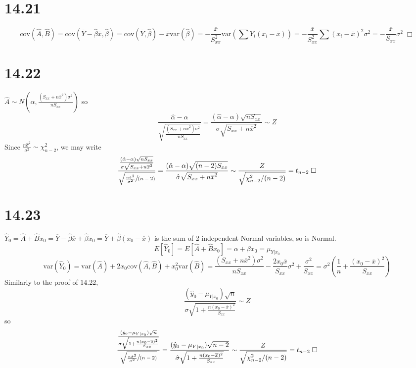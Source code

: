 \documentclass{article}
\begin{document}
\section*{14.21}
$$\mathrm{cov}(\hat{A},\hat{B}) = \mathrm{cov}(\overline{Y}-\hat{\beta}\overline{x}, \hat{\beta}) = \mathrm{cov}(\overline{Y},\hat{\beta}) - \overline{x}\mathrm{var}(\hat{\beta}) = - \frac{\overline{x}}{S_{xx}^2}\mathrm{var}(\sum Y_i(x_i-\overline{x})) = - \frac{\overline{x}}{S_{xx}^2}\sum (x_i-\overline{x})^2\sigma^2 = - \frac{\overline{x}}{S_{xx}}\sigma^2 \; \Box$$

\section*{14.22}
$\hat{A} \sim N(\alpha, \frac{(S_{xx}+n\overline{x}^2)\sigma^2}{nS_{xx}})$ so
$$\frac{\hat{\alpha}- \alpha}{\sqrt{\frac{(S_{xx}+n\overline{x}^2)\sigma^2}{nS_{xx}}}} = \frac{(\hat{\alpha}- \alpha)\sqrt{nS_{xx}}}{\sigma\sqrt{S_{xx}+n\overline{x}^2}} \sim Z$$
Since $\frac{n\hat{\sigma}^2}{\sigma^2} \sim \chi^2_{n-2}$, we may write
$$\frac{\frac{(\hat{\alpha}- \alpha)\sqrt{nS_{xx}}}{\sigma\sqrt{S_{xx}+n\overline{x}^2}}}{\sqrt{\sfrac{\frac{n\hat{\sigma}^2}{\sigma^2}}{(n-2)}}} = \frac{(\hat{\alpha}- \alpha)\sqrt{(n-2)S_{xx}}}{\hat{\sigma}\sqrt{S_{xx}+n\overline{x}^2}} \sim \frac{Z}{\sqrt{\chi^2_{n-2}/(n-2)}} = t_{n-2} \;\Box$$

\section*{14.23}
$\hat{Y}_0 = \hat{A} + \hat{B}x_0 = \overline{Y} - \hat{\beta}\overline{x} + \hat{\beta}x_0 = \overline{Y} + \hat{\beta}(x_0-\overline{x})$ is the sum of 2 independent Normal variables, so is Normal.
$$E[\hat{Y}_0] = E[\hat{A}+\hat{B}x_0] = \alpha + \beta x_0 = \mu_{Y|x_0}$$
$$\mathrm{var}(\hat{Y}_0) = \mathrm{var}(\hat{A}) + 2x_0\mathrm{cov}(\hat{A},\hat{B}) + x_0^2\mathrm{var}(\hat{B}) = \frac{(S_{xx}+n\overline{x}^2)\sigma^2}{nS_{xx}} - \frac{2x_0\overline{x}}{S_{xx}}\sigma^2 + \frac{\sigma^2}{S_{xx}} = \sigma^2\left(\frac{1}{n} + \frac{(x_0-\overline{x})^2}{S_{xx}}\right)$$
Similarly to the proof of 14.22,
$$\frac{(\hat{y}_0-\mu_{Y|x_0})\sqrt{n}}{\sigma \sqrt{1+\frac{n(x_0-\overline{x})^2}{S_{xx}}}} \sim Z$$
so
$$\frac{\frac{(\hat{y}_0-\mu_{Y|x_0})\sqrt{n}}{\sigma \sqrt{1+\frac{n(x_0-\overline{x})^2}{S_{xx}}}}}{\sqrt{\sfrac{\frac{n\hat{\sigma}^2}{\sigma^2}}{(n-2)}}} = \frac{(\hat{y}_0-\mu_{Y|x_0})\sqrt{n-2}}{\hat{\sigma} \sqrt{1+\frac{n(x_0-\overline{x})^2}{S_{xx}}}} \sim \frac{Z}{\sqrt{\chi^2_{n-2}/(n-2)}} = t_{n-2} \; \Box$$
\end{document}
